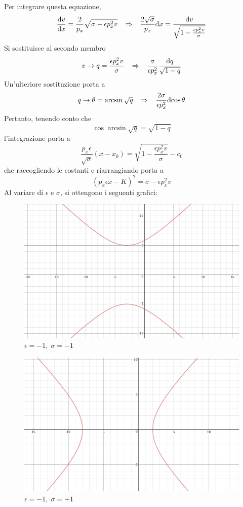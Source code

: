 Per integrare questa equazione,
\[ \frac{\mathrm{d} v}{\mathrm{d} x} = \frac{2}{p_x}\sqrt{\sigma - \epsilon p_x^2 v} \;\;\; \Rightarrow \;\;\;
	\frac{2\sqrt{\sigma}}{p_x} \mathrm{d} x = \frac{\mathrm{d} v}{ \sqrt{1 - \frac{\epsilon p_x^2 v}{\sigma}}} \]
Si sostituisce al secondo membro 
\[ v \rightarrow q = \frac{\epsilon p_x^2 v}{\sigma} \;\;\;\Rightarrow\;\;\; 
	\frac{\sigma}{\epsilon p_x^2} \frac{\mathrm{d} q}{\sqrt{1-q}} \]
Un'ulteriore sostituzione porta a 
\[ q \rightarrow \theta=\arcsin{\sqrt{q}} \;\;\;\Rightarrow\;\;\;
	\frac{2\sigma}{\epsilon p_x^2} \mathrm{d}{\cos\theta} \]
Pertanto, tenendo conto che 
\[ \cos\arcsin\sqrt{q} = \sqrt{1-q} \]
l'integrazione porta a 
\[ \frac{p_x\epsilon}{\sqrt{\sigma}}(x-x_0) = \sqrt{1-\frac{\epsilon p_x^2 v}{\sigma}} -c_0 \]
che raccogliendo le costanti e riarrangiando porta a 
\[ (p_x \epsilon x - K)^2 = \sigma - \epsilon p_x^2v \]
Al variare di $\epsilon$ e $\sigma$, si ottengono i seguenti grafici:
\begin{figure}[htbp]
 \centering
 \includegraphics[width=\textwidth]{images/foglio3_neg_neg}
	\caption{\(\epsilon=-1, \;\sigma=-1\)}
 \label{figure:neg_neg}
\end{figure}
\begin{figure}[htbp]
 \centering
 \includegraphics[width=\textwidth]{images/foglio3_pos_neg}
	\caption{\(\epsilon=-1, \;\sigma=+1\)}
 \label{figure:pos_neg}
\end{figure}

